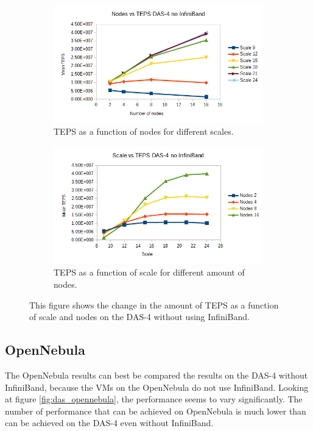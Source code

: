 \begin{figure}[!h]
\centering
\begin{subfigure}{.5\textwidth}
  \centering
  \includegraphics[width=\linewidth]{images/nodes_no_infini.png}
  \caption{TEPS as a function of nodes for different scales.}
  \label{fig:nodes_no_infini}
\end{subfigure}%
\begin{subfigure}{.5\textwidth}
  \centering
  \includegraphics[width=\linewidth]{images/scale_no_infini.png}
  \caption{TEPS as a function of scale for different amount of nodes.}
  \label{fig:scale_no_infini}
\end{subfigure}
\caption{This figure shows the change in the amount of TEPS as a function of scale and nodes on the DAS-4 without using InfiniBand.}
\label{fig:das_no_infini}
\end{figure}

\subsection{OpenNebula}
The OpenNebula results can best be compared the results on the DAS-4 without InfiniBand, because the VMs on the OpenNebula do not use InfiniBand.
Looking at figure \ref{fig:das_opennebula}, the performance seems to vary significantly. The number of performance that can be achieved on OpenNebula is much lower than can be achieved on the DAS-4 even  without InfiniBand. 

